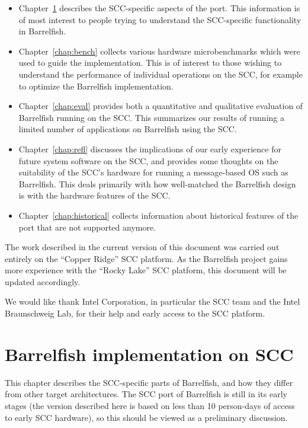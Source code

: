 \documentclass[a4paper,twoside]{report} %
\begin{document}
\begin{itemize}

\item Chapter~\ref{chap:impl} describes the SCC-specific aspects of the
port. This information is of most interest to people trying to
understand the SCC-specific functionality in Barrelfish. 

\item Chapter~\ref{chap:bench} collects various hardware
  microbenchmarks which were used to guide the implementation.  This
  is of interest to those wishing to understand the performance of
  individual operations on the SCC, for example to optimize the 
  Barrelfish implementation. 

\item Chapter~\ref{chap:eval} provides both a quantitative and
  qualitative evaluation of Barrelfish running on the SCC.  This
  summarizes our results of running a limited number of applications
  on Barrelfish using the SCC. 

\item Chapter~\ref{chap:refl} discusses the implications of our early
  experience for future system software on the SCC, and provides some
  thoughts on the suitability of the SCC's hardware for running a
  message-based OS such as Barrelfish.  This deals primarily with how
  well-matched the Barrelfish design is with the hardware features of
  the SCC. 

\item Chapter~\ref{chap:historical} collects information about
  historical features of the port that are not supported anymore.
\end{itemize}

The work described in the current version of this document was carried
out entirely on the ``Copper Ridge'' SCC platform.  
As the Barrelfish project gains more experience with the ``Rocky
Lake'' SCC platform, this document will be updated accordingly. 

We would like
thank Intel Corporation, in particular the SCC team and the Intel
Braunschweig Lab, for their help and early access to the SCC
platform. 


\chapter{Barrelfish implementation on SCC}\label{chap:impl}

This chapter describes the SCC-specific parts of Barrelfish, and how
they differ from other target architectures.   The SCC port of
Barrelfish is still in its early stages (the version described here is
based on less than 10 person-days of access to early SCC hardware), so
this should be viewed as a preliminary discussion.  
\end{document}
